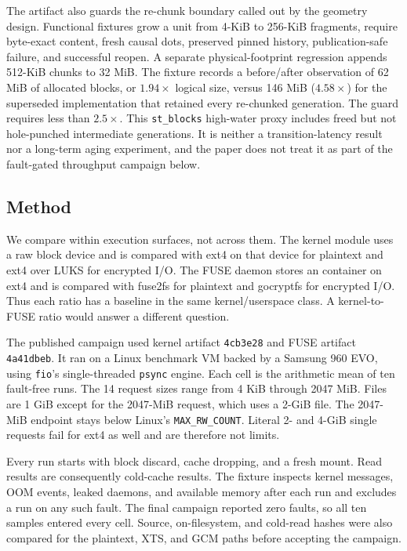 The artifact also guards the re-chunk boundary called out by the geometry
design.  Functional fixtures grow a unit from 4-KiB to 256-KiB fragments,
require byte-exact content, fresh causal dots, preserved pinned history,
publication-safe failure, and successful reopen.  A separate physical-footprint
regression appends 512-KiB chunks to 32 MiB.  The fixture records a before/after
observation of 62 MiB of allocated blocks, or \(1.94\times\) logical size,
versus 146 MiB (\(4.58\times\)) for the superseded implementation that retained every
re-chunked generation.  The guard requires less than \(2.5\times\).  This
\texttt{st\_blocks} high-water proxy includes freed but not hole-punched
intermediate generations.  It is neither a transition-latency result nor a
long-term aging experiment, and the paper does not treat it as part of the
fault-gated throughput campaign below.

\subsection{Method}
\label{subsec:eval-method}

We compare within execution surfaces, not across them.  The kernel module uses
a raw block device and is compared with ext4 on that device for plaintext and
ext4 over LUKS for encrypted I/O.  The FUSE daemon stores an \sfs{} container
on ext4 and is compared with fuse2fs for plaintext and gocryptfs for encrypted
I/O.  Thus each ratio has a baseline in the same kernel/userspace class.  A
kernel-to-FUSE ratio would answer a different question.

The published campaign used kernel artifact \texttt{4cb3e28} and FUSE artifact
\texttt{4a41dbeb}.  It ran on a Linux benchmark VM backed by a Samsung 960 EVO,
using \texttt{fio}'s single-threaded \texttt{psync} engine.  Each cell is the
arithmetic mean of ten fault-free runs.  The 14 request sizes range from 4 KiB
through 2047 MiB.  Files are 1 GiB except for the 2047-MiB request, which uses a
2-GiB file.  The 2047-MiB endpoint stays below Linux's
\texttt{MAX\_RW\_COUNT}.  Literal 2- and 4-GiB single requests fail for ext4 as
well and are therefore not \sfs{} limits.

Every run starts with block discard, cache dropping, and a fresh mount.  Read
results are consequently cold-cache results.  The fixture inspects kernel
messages, OOM events, leaked daemons, and available memory after each run and
excludes a run on any such fault.  The final campaign reported zero faults, so
all ten samples entered every cell.  Source, on-filesystem, and cold-read hashes
were also compared for the plaintext, XTS, and GCM paths before accepting the
campaign.

